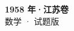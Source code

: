\documentclass[zihao=-4, a4paper]{ctexart}
\begin{document}
\begin{center}
  {\Large\bfseries 1958 年·江苏卷}\\[4pt]
  {\large 数学 · 试题版}
\end{center}
\medskip
{}

\end{document}
